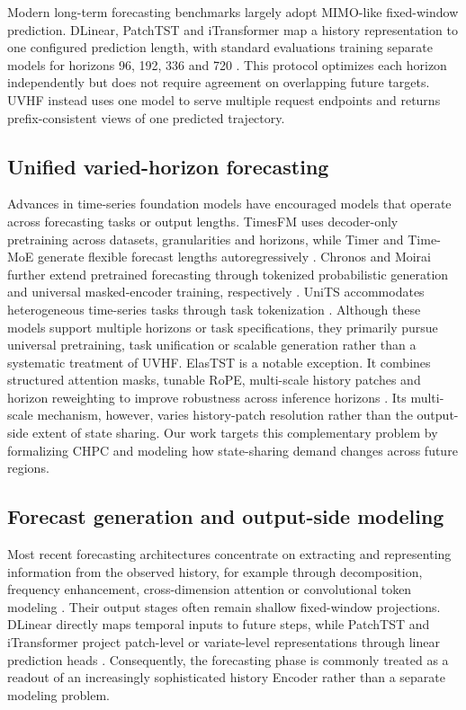 \documentclass[final,3p,times]{elsarticle}
\begin{document}
Modern long-term forecasting benchmarks largely adopt MIMO-like fixed-window prediction. DLinear, PatchTST and iTransformer map a history representation to one configured prediction length, with standard evaluations training separate models for horizons 96, 192, 336 and 720 \citep{zeng2023dlinear,nie2023patchtst,liu2024itransformer}. This protocol optimizes each horizon independently but does not require agreement on overlapping future targets. UVHF instead uses one model to serve multiple request endpoints and returns prefix-consistent views of one predicted trajectory.

\subsection{Unified varied-horizon forecasting}


Advances in time-series foundation models have encouraged models that operate across forecasting tasks or output lengths. TimesFM uses decoder-only pretraining across datasets, granularities and horizons, while Timer and Time-MoE generate flexible forecast lengths autoregressively \citep{das2024timesfm,liu2024timer,shi2025timemoe}. Chronos and Moirai further extend pretrained forecasting through tokenized probabilistic generation and universal masked-encoder training, respectively \citep{ansari2024chronos,woo2024moirai}. UniTS accommodates heterogeneous time-series tasks through task tokenization \citep{gao2024units}. Although these models support multiple horizons or task specifications, they primarily pursue universal pretraining, task unification or scalable generation rather than a systematic treatment of UVHF. ElasTST is a notable exception. It combines structured attention masks, tunable RoPE, multi-scale history patches and horizon reweighting to improve robustness across inference horizons \citep{zhang2024elastst}. Its multi-scale mechanism, however, varies history-patch resolution rather than the output-side extent of state sharing. Our work targets this complementary problem by formalizing CHPC and modeling how state-sharing demand changes across future regions.

\subsection{Forecast generation and output-side modeling}


Most recent forecasting architectures concentrate on extracting and representing information from the observed history, for example through decomposition, frequency enhancement, cross-dimension attention or convolutional token modeling \citep{wu2021autoformer,zhou2022fedformer,liu2022nonstationary,zhang2023crossformer,luo2024moderntcn}. Their output stages often remain shallow fixed-window projections. DLinear directly maps temporal inputs to future steps, while PatchTST and iTransformer project patch-level or variate-level representations through linear prediction heads \citep{zeng2023dlinear,nie2023patchtst,liu2024itransformer}. Consequently, the forecasting phase is commonly treated as a readout of an increasingly sophisticated history Encoder rather than a separate modeling problem.
\end{document}
